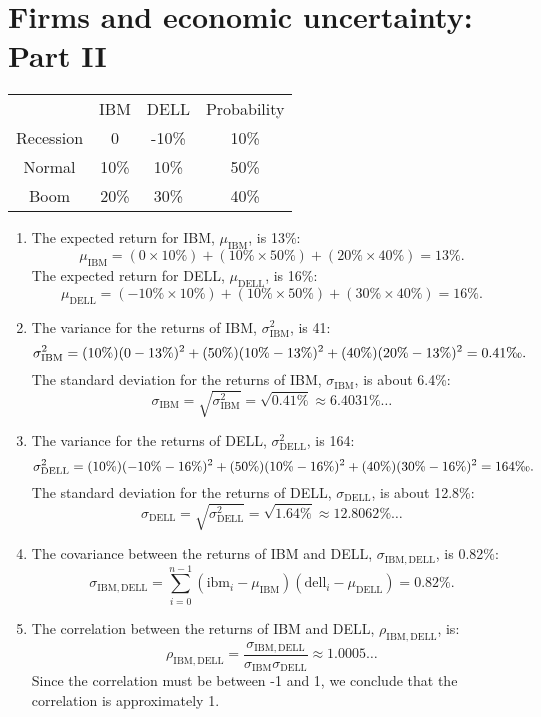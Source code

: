 \documentclass[12pt]{article}
\begin{document}
\section{Firms and economic uncertainty: Part II}
\begin{center}\begin{tabular}{c||c|c|c}
&IBM&DELL&Probability\\
Recession&0&-10\%&10\%\\
Normal&10\%&10\%&50\%\\
Boom&20\%&30\%&40\%
\end{tabular}\end{center}
\begin{enumerate}
    \item The expected return for IBM, $\mu_{\mathrm{IBM}}$, is 13\%:
    \[\mu_{\mathrm{IBM}}=(0\times 10\%)+(10\%\times 50\%)+(20\%\times 40\%)=13\%.\]
    The expected return for DELL, $\mu_{\mathrm{DELL}}$, is 16\%:
    \[\mu_{\mathrm{DELL}}=(-10\%\times 10\%)+(10\%\times 50\%)+(30\%\times 40\%)=16\%.\]
    \item The variance for the returns of IBM, $\sigma^2_{\mathrm{IBM}}$, is 41\textperthousand:
    \[\sigma^2_{\mathrm{IBM}}=(10\%)(0-13\%)^2+(50\%)(10\%-13\%)^2+(40\%)(20\%-13\%)^2=0.41\text{\textperthousand}.\]
    The standard deviation for the returns of IBM, $\sigma_{\mathrm{IBM}}$, is about 6.4\%:
    \[\sigma_{\mathrm{IBM}}=\sqrt{\sigma^2_{\mathrm{IBM}}}=\sqrt{0.41\%}\approx 6.4031\%\dots\]
    \item The variance for the returns of DELL, $\sigma^2_{\mathrm{DELL}}$, is 164\textperthousand:
    \[\sigma^2_{\mathrm{DELL}}=(10\%)(-10\%-16\%)^2+(50\%)(10\%-16\%)^2+(40\%)(30\%-16\%)^2=164\text{\textperthousand}.\]
    The standard deviation for the returns of DELL, $\sigma_{\mathrm{DELL}}$, is about 12.8\%:
    \[\sigma_{\mathrm{DELL}}=\sqrt{\sigma^2_{\mathrm{DELL}}}=\sqrt{1.64\%}\approx 12.8062\%\dots\]
    \item The covariance between the returns of IBM and DELL, $\sigma_{\mathrm{IBM},\mathrm{DELL}}$, is 0.82\%:
    \[\sigma_{\mathrm{IBM},\mathrm{DELL}}=\sum_{i=0}^{n-1}(\mathrm{ibm}_i-\mu_{\mathrm{IBM}})(\mathrm{dell}_i-\mu_{\mathrm{DELL}})=0.82\%.\]
    \item The correlation between the returns of IBM and DELL, $\rho_{\mathrm{IBM},\mathrm{DELL}}$, is:
    \[\rho_{\mathrm{IBM},\mathrm{DELL}}=\frac{\sigma_{\mathrm{IBM},\mathrm{DELL}}}{\sigma_{\mathrm{IBM}}\sigma_{\mathrm{DELL}}}\approx 1.0005\dots\]
    Since the correlation must be between -1 and 1, we conclude that the correlation is approximately 1.
\end{enumerate}
\end{document}
